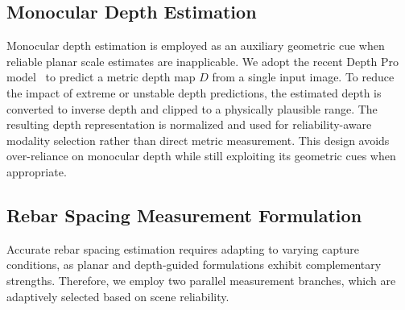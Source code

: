 \documentclass{article}
\begin{document}
\subsection{Monocular Depth Estimation}
\label{sub:depth}

Monocular depth estimation is employed as an auxiliary geometric cue when reliable planar scale estimates are inapplicable. We adopt the recent Depth Pro model~\cite{depth_pro} to predict a metric depth map $D$ from a single input image. To reduce the impact of extreme or unstable depth predictions, the estimated depth is converted to inverse depth and clipped to a physically plausible range. The resulting depth representation is normalized and used for reliability-aware modality selection rather than direct metric measurement. This design avoids over-reliance on monocular depth while still exploiting its geometric cues when appropriate.

\vspace{-0.3cm}

\subsection{Rebar Spacing Measurement Formulation}
\label{sub:spacing_measure}
Accurate rebar spacing estimation requires adapting to varying capture conditions, as planar and depth-guided formulations exhibit complementary strengths. Therefore, we employ two parallel measurement branches, which are adaptively selected based on scene reliability.
\end{document}
